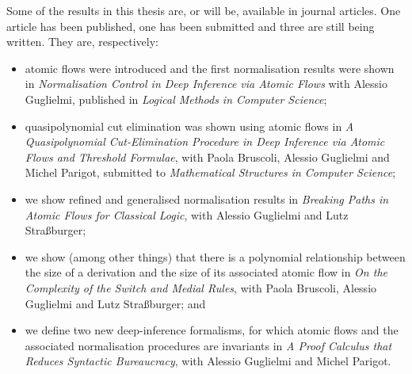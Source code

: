 % 
% 
% 
% 

Some of the results in this thesis are, or will be, available in journal articles. One article has been published, one has been submitted and three are still being written. They are, respectively:
\begin{itemize}
 \item atomic flows were introduced and the first normalisation results were shown in \emph{Normalisation Control in Deep Inference via Atomic Flows} with Alessio Guglielmi, published in \emph{Logical Methods in Computer Science};
 \item quasipolynomial cut elimination was shown using atomic flows in \emph{A Quasipolynomial Cut-Elimination Procedure in Deep Inference via Atomic Flows and Threshold Formulae}, with Paola Bruscoli, Alessio Guglielmi and Michel Parigot, submitted to \emph{Mathematical Structures in Computer Science};
 \item we show refined and generalised normalisation results in \emph{Breaking Paths in Atomic Flows for Classical Logic}, with Alessio Guglielmi and Lutz Stra{\ss}burger;
 \item we show (among other things) that there is a polynomial relationship between the size of a derivation and the size of its associated atomic flow in \emph{On the Complexity of the Switch and Medial Rules}, with Paola Bruscoli, Alessio Guglielmi and Lutz Stra\ss{}burger; and
 \item we define two new deep-inference formalisms, for which atomic flows and the associated normalisation procedures are invariants in \emph{A Proof Calculus that Reduces Syntactic Bureaucracy}, with Alessio Guglielmi and Michel Parigot.
\end{itemize}

